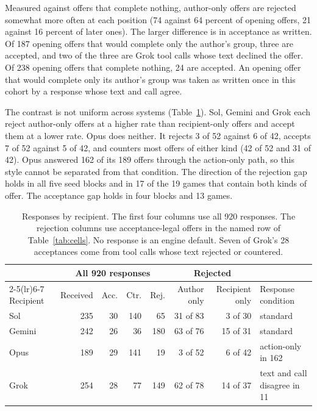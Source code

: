 Measured against offers that complete nothing, author-only offers are rejected somewhat more often at each position (74 against 64 percent of opening offers, 21 against 16 percent of later ones). The larger difference is in acceptance as written. Of 187 opening offers that would complete only the author's group, three are accepted, and two of the three are Grok tool calls whose text declined the offer. Of 238 opening offers that complete nothing, 24 are accepted. An opening offer that would complete only its author's group was taken as written once in this cohort by a response whose text and call agree.

The contrast is not uniform across systems (Table~\ref{tab:styles}). Sol, Gemini and Grok each reject author-only offers at a higher rate than recipient-only offers and accept them at a lower rate. Opus does neither. It rejects 3 of 52 against 6 of 42, accepts 7 of 52 against 5 of 42, and counters most offers of either kind (42 of 52 and 31 of 42). Opus answered 162 of its 189 offers through the action-only path, so this style cannot be separated from that condition. The direction of the rejection gap holds in all five seed blocks and in 17 of the 19 games that contain both kinds of offer. The acceptance gap holds in four blocks and 13 games.

\begin{table}[t]
\centering\small
\begin{tabular}{@{}lrrrrrrl@{}}
\toprule
 & \multicolumn{4}{c}{All 920 responses} & \multicolumn{2}{c}{Rejected} & \\
\cmidrule(lr){2-5}\cmidrule(lr){6-7}
Recipient & Received & Acc. & Ctr. & Rej. & Author only & Recipient only & Response condition\\
\midrule
Sol & 235 & 30 & 140 & 65 & 31 of 83 & 3 of 30 & standard\\
Gemini & 242 & 26 & 36 & 180 & 63 of 76 & 15 of 31 & standard\\
Opus & 189 & 29 & 141 & 19 & 3 of 52 & 6 of 42 & action-only in 162\\
Grok & 254 & 28 & 77 & 149 & 62 of 78 & 14 of 37 & text and call disagree in 11\\
\bottomrule
\end{tabular}
\caption{Responses by recipient. The first four columns use all 920 responses. The rejection columns use acceptance-legal offers in the named row of Table~\ref{tab:cells}. No response is an engine default. Seven of Grok's 28 acceptances come from tool calls whose text rejected or countered.}
\label{tab:styles}
\end{table}

